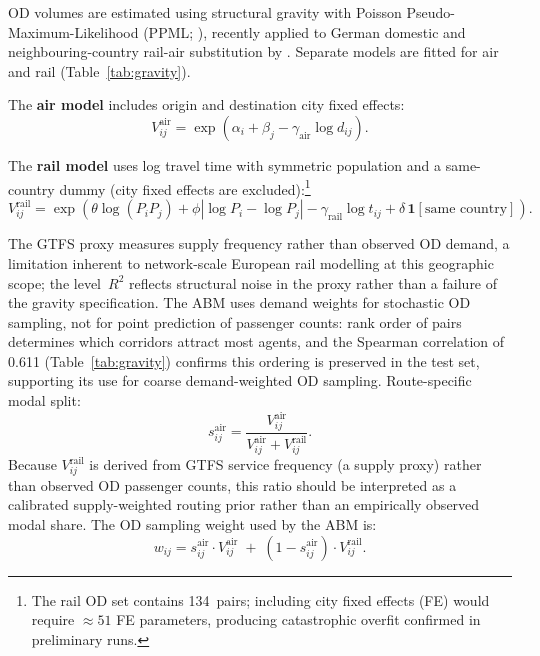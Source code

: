 \documentclass[12pt,a4paper]{article}
\begin{document}
OD volumes are estimated using structural gravity \citep{Anderson2003} with
Poisson Pseudo-Maximum-Likelihood (PPML; \citealt{SantosSilva2006}),
recently applied to German domestic and neighbouring-country rail-air substitution by \citet{Oesingmann2025}.
Separate models are fitted for air and rail (Table~\ref{tab:gravity}).

The \textbf{air model} includes origin and destination city fixed effects:
\begin{equation}
  V_{ij}^{\text{air}} = \exp\!\left(\alpha_i + \beta_j - \gamma_{\text{air}}
  \log d_{ij}\right).
  \label{eq:gravity_air}
\end{equation}

The \textbf{rail model} uses log travel time with symmetric population and a
same-country dummy (city fixed effects are excluded):\footnote{The rail OD set contains
134~pairs; including city fixed effects (FE) would require ${\approx}51$ FE parameters,
producing catastrophic overfit confirmed in preliminary runs.}
\begin{equation}
  V_{ij}^{\text{rail}} = \exp\!\left(\theta \log(P_i P_j)
  + \phi \left|\log P_i - \log P_j\right|
  - \gamma_{\text{rail}} \log t_{ij}
  + \delta \,\mathbf{1}[\text{same country}]\right).
  \label{eq:gravity_rail}
\end{equation}

The GTFS proxy measures supply frequency rather than observed OD demand, a limitation
inherent to network-scale European rail modelling at this geographic scope; the
level~$R^2$ reflects structural noise in the proxy rather than a failure of the gravity
specification.
The ABM uses demand weights for stochastic OD sampling, not for point prediction of
passenger counts: rank order of pairs determines which corridors attract most agents,
and the Spearman correlation of 0.611 (Table~\ref{tab:gravity}) confirms this ordering is
preserved in the test set, supporting its use for coarse demand-weighted OD sampling.
Route-specific modal split:
\begin{equation}
  s_{ij}^{\text{air}} = \frac{V_{ij}^{\text{air}}}{V_{ij}^{\text{air}} + V_{ij}^{\text{rail}}}.
  \label{eq:modal_split}
\end{equation}
Because $V_{ij}^{\text{rail}}$ is derived from GTFS service frequency (a supply proxy)
rather than observed OD passenger counts, this ratio should be interpreted as a
calibrated supply-weighted routing prior rather than an empirically observed modal share.
The OD sampling weight used by the ABM is:
\begin{equation}
  w_{ij} = s_{ij}^{\text{air}} \cdot V_{ij}^{\text{air}} \;+\;
            (1 - s_{ij}^{\text{air}}) \cdot V_{ij}^{\text{rail}}.
  \label{eq:od_weight}
\end{equation}
\end{document}
